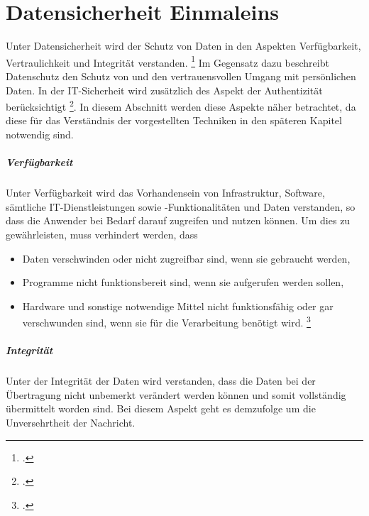 \documentclass  [paper=a4,
				fontsize=12pt,
				listof=totoc,
				bibliography=totoc
				]{scrreprt}
\begin{document}
		\color{black}

	\chapter{Datensicherheit Einmaleins}
	Unter Datensicherheit wird der Schutz von Daten in den Aspekten Verfügbarkeit, Vertraulichkeit und Integrität verstanden. \footcite{BSI2014} Im Gegensatz dazu beschreibt Datenschutz den Schutz von und den vertrauensvollen Umgang mit persönlichen Daten. In der IT-Sicherheit wird zusätzlich des Aspekt der Authentizität berücksichtigt \footcite{Berliner2014}. In diesem Abschnitt werden diese Aspekte näher betrachtet, da diese für das Verständnis der vorgestellten Techniken in den späteren Kapitel notwendig sind.
	
	\paragraph{Verfügbarkeit}
	
	Unter Verfügbarkeit wird das Vorhandensein von Infrastruktur, Software, sämtliche IT-Dienstleistungen sowie -Funktionalitäten und Daten verstanden, so dass die Anwender bei Bedarf darauf zugreifen und nutzen können. Um dies zu gewährleisten, muss verhindert werden, dass
	\begin{itemize}
	\item Daten verschwinden oder nicht zugreifbar sind, wenn sie gebraucht werden,
	\item Programme nicht funktionsbereit sind, wenn sie aufgerufen werden sollen,
	\item Hardware und sonstige notwendige Mittel nicht funktionsfähig oder gar verschwunden sind, wenn sie für die Verarbeitung benötigt wird. \footcite{Berliner2014}
	\end{itemize}
	
	\paragraph{Integrität}
	
	Unter der Integrität der Daten wird verstanden, dass die Daten bei der Übertragung nicht unbemerkt verändert werden können und somit vollständig übermittelt worden sind. Bei diesem Aspekt geht es demzufolge um die Unversehrtheit der Nachricht.
	
\end{document}
